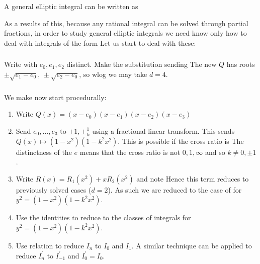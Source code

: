 \documentclass{article}
\begin{document}
\begin{prop}
A general elliptic integral can be written as 
\end{prop}
As a results of this, because any rational integral can be solved through partial fractions, in order to study general elliptic integrals we need know only how to deal with integrals of the form 
Let us start to deal with these:
\subsubsection{}
Write 
with $e_0,e_1,e_2$ distinct. Make the substitution 
sending 
The new $Q$ has roots $\pm \sqrt{e_1 - e_0}, \, \pm\sqrt{e_2 - e_0}$, so wlog we may take $d=4$.
\subsubsection{}
We make now start procedurally:
\begin{enumerate}
	\item Write $Q(x) = (x-e_0)(x-e_1)(x-e_2)(x-e_3)$
	\item Send $e_0, \dots, e_3$ to $\pm1, \pm \frac{1}{k}$ using a fractional linear transform. This sends $Q(x) \mapsto (1-x^2)(1-k^2 x^2)$. This is possible if the cross ratio is 
The distinctness of the $e$ means that the cross ratio is not $0,1,\infty$ and so $k \neq 0, \pm 1$.
\item Write $R(x) = R_1(x^2) + xR_2(x^2)$ and note 
Hence this term reduces to previously solved cases ($d=2$). As such we are reduced to the case of
for $y^2 = (1-x^2)(1-k^2 x^2)$. 
\item Use the identities 
to reduce to the classes of integrals
for $y^2 = (1-x^2)(1-k^2 x^2)$.
\item Use relation 
to reduce $I_n$ to $I_0$ and $I_1$. A similar technique can be applied to reduce $I_n^\prime$ to $I_{-1}^\prime$ and $I_0^\prime=I_0$. 
\end{enumerate}
\end{document}

